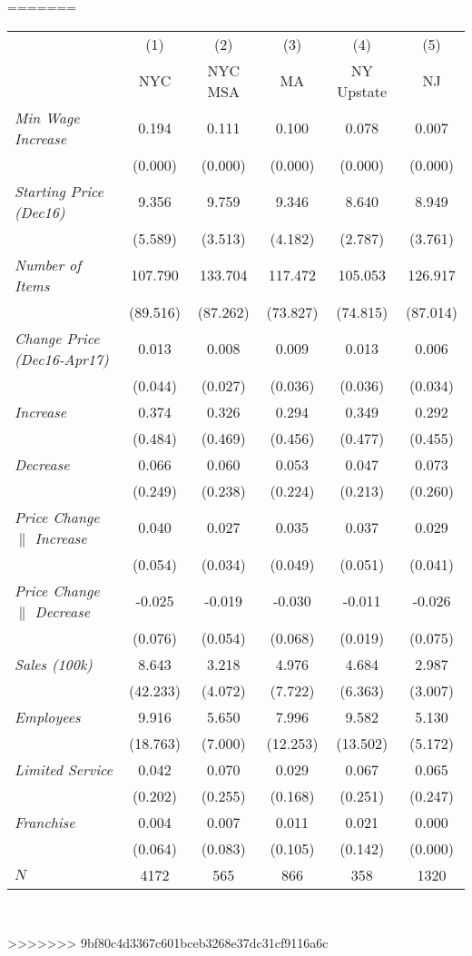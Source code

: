 =======
\begin{center}
\begin{tabular}{lccccc}
\hline  & (1) & (2) & (3) & (4) & (5)\\
 & NYC & NYC MSA & MA & NY Upstate & NJ\\
\hline  \textit{Min Wage Increase}  & 0.194 & 0.111 & 0.100 & 0.078 & 0.007\\
  & (0.000) & (0.000) & (0.000) & (0.000) & (0.000)\\
 \textit{Starting Price (Dec16)}  & 9.356 & 9.759 & 9.346 & 8.640 & 8.949\\
  & (5.589) & (3.513) & (4.182) & (2.787) & (3.761)\\
 \textit{Number of Items}  & 107.790 & 133.704 & 117.472 & 105.053 & 126.917\\
  & (89.516) & (87.262) & (73.827) & (74.815) & (87.014)\\
 \textit{Change Price (Dec16-Apr17)}  & 0.013 & 0.008 & 0.009 & 0.013 & 0.006\\
  & (0.044) & (0.027) & (0.036) & (0.036) & (0.034)\\
 \textit{Increase}  & 0.374 & 0.326 & 0.294 & 0.349 & 0.292\\
  & (0.484) & (0.469) & (0.456) & (0.477) & (0.455)\\
 \textit{Decrease}  & 0.066 & 0.060 & 0.053 & 0.047 & 0.073\\
  & (0.249) & (0.238) & (0.224) & (0.213) & (0.260)\\
 \textit{Price Change $\|$ Increase}  & 0.040 & 0.027 & 0.035 & 0.037 & 0.029\\
  & (0.054) & (0.034) & (0.049) & (0.051) & (0.041)\\
 \textit{Price Change $\|$ Decrease}  & -0.025 & -0.019 & -0.030 & -0.011 & -0.026\\
  & (0.076) & (0.054) & (0.068) & (0.019) & (0.075)\\
 \textit{Sales (100k)}  & 8.643 & 3.218 & 4.976 & 4.684 & 2.987\\
  & (42.233) & (4.072) & (7.722) & (6.363) & (3.007)\\
 \textit{Employees} & 9.916 & 5.650 & 7.996 & 9.582 & 5.130\\
  & (18.763) & (7.000) & (12.253) & (13.502) & (5.172)\\
 \textit{Limited Service}  & 0.042 & 0.070 & 0.029 & 0.067 & 0.065\\
  & (0.202) & (0.255) & (0.168) & (0.251) & (0.247)\\
 \textit{Franchise}  & 0.004 & 0.007 & 0.011 & 0.021 & 0.000\\
  & (0.064) & (0.083) & (0.105) & (0.142) & (0.000)\\
\hline  $ N $  & 4172 & 565 & 866 & 358 & 1320\\
\hline\end{tabular}\\
\end{center}
>>>>>>> 9bf80c4d3367c601bceb3268e37dc31cf9116a6c
